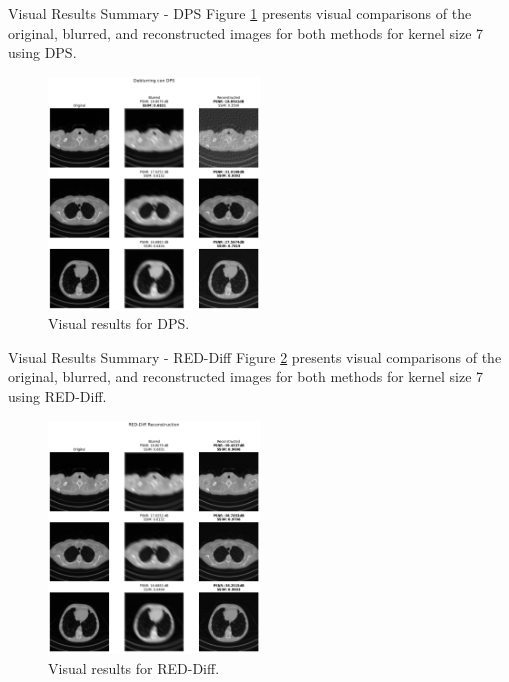 \begin{frame}{Visual Results Summary - DPS}
    Figure \ref{fig:visual_results_dps} presents visual comparisons of the original, blurred, and reconstructed images for both methods for kernel size 7 using DPS.
    \begin{figure}
        \centering
        \includegraphics[width=0.5\textwidth]{media/deblurring_dps.png}
        \caption{Visual results for DPS.}
        \label{fig:visual_results_dps}
    \end{figure}

\end{frame}
\begin{frame}{Visual Results Summary - RED-Diff}
    Figure \ref{fig:visual_results_red_diff} presents visual comparisons of the original, blurred, and reconstructed images for both methods for kernel size 7 using RED-Diff.
    \begin{figure}
        \centering
        \includegraphics[width=0.5\textwidth]{media/deblurring_reddiff.png}
        \caption{Visual results for RED-Diff.}
        \label{fig:visual_results_red_diff}
    \end{figure}
\end{frame}


